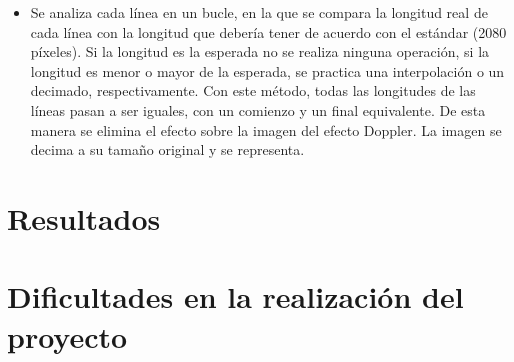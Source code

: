 \documentclass[a4paper,openright,12pt]{article}
\begin{document}
\begin{itemize}
\begin{itemize}
	\item Se analiza cada línea en un bucle, en la que se compara la longitud real de cada línea con la longitud que debería tener de acuerdo con el estándar (2080 píxeles). Si la longitud es la esperada no se realiza ninguna operación, si la longitud es menor o mayor de la esperada, se practica una interpolación o un decimado, respectivamente. Con este método, todas las longitudes de las líneas pasan a ser iguales, con un comienzo y un final equivalente. De esta manera se elimina el efecto sobre la imagen del efecto Doppler. La imagen se decima a su tamaño original y se representa.
	




\end{itemize}
	

	
	
	\end{itemize}

\section{Resultados}

\section{Dificultades en la realización del proyecto}
\end{document}
